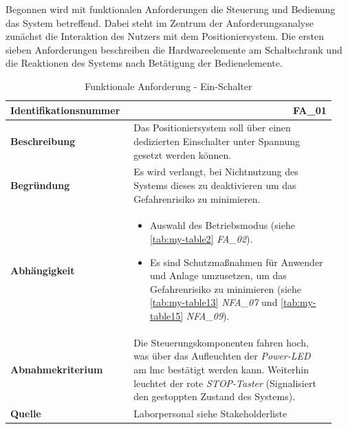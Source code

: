 \documentclass[../../../Bachelorarbeit.tex]{subfiles}
\begin{document}
Begonnen wird mit funktionalen Anforderungen die Steuerung und Bedienung das System betreffend. Dabei steht im Zentrum der Anforderungsanalyse zunächst die Interaktion des Nutzers mit dem Positioniersystem. Die ersten sieben Anforderungen beschreiben die Hardwareelemente am Schaltschrank und die Reaktionen des Systems nach Betätigung der Bedienelemente.
\begin{table}[H]
    \centering
    \begin{tabular}{ p{0.34\linewidth}  p{0.6\linewidth} }
        \hline
        \textbf{Identifikationsnummer}  & \multicolumn{1}{r}{FA\_01} \\ \hline
        \textbf{Beschreibung}           & Das Positioniersystem soll über einen dedizierten Einschalter unter Spannung gesetzt werden können. \\
        \textbf{Begründung}             & Es wird verlangt, bei Nichtnutzung des Systems dieses zu deaktivieren um das Gefahrenrisiko zu minimieren. \\
        \textbf{Abhängigkeit}           &   {\begin{itemize}[noitemsep,topsep=0pt,parsep=0pt,partopsep=0pt,leftmargin=*]
                                                \item Auswahl des Betriebsmodus (siehe \autoref{tab:my-table2} \textit{FA\_02}).
                                                \item Es sind Schutzmaßnahmen für Anwender und Anlage umzusetzen, um das Gefahrenrisiko zu minimieren (siehe \autoref{tab:my-table13} \textit{NFA\_07} und \autoref{tab:my-table15} \textit{NFA\_09}).
                                            \end{itemize}} \\
        \textbf{Abnahmekriterium}       & Die Steuerungskomponenten fahren hoch, was über das Aufleuchten der \textit{Power-LED} am \acs{lmc} bestätigt werden kann. Weiterhin leuchtet der rote \textit{STOP-Taster} (Signalisiert den gestoppten Zustand des Systems). \\
        \textbf{Quelle}                 & Laborpersonal siehe Stakeholderliste \\ \hline
    \end{tabular}
    \caption[\acs{fa} - EIN-Schalter]{Funktionale Anforderung - Ein-Schalter}
    \label{tab:my-table}
\end{table}
\end{document}
